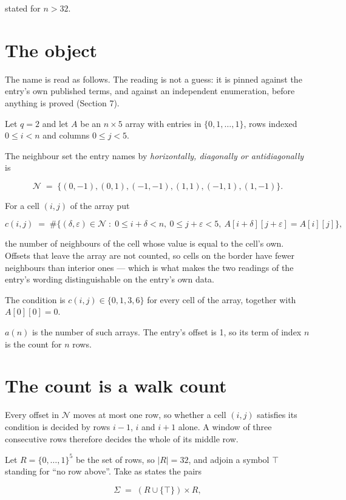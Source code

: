 \documentclass[11pt]{article}
\theoremstyle{definition}
\begin{document}
stated for $n > 32$.

\section{The object}

The name is read as follows. The reading is not a guess: it is pinned against the entry's own published terms, and against an independent enumeration, before anything is proved (Section 7).

Let $q = 2$ and let $A$ be an $n \times 5$ array with entries in $\{0,1,\dots,1\}$, rows indexed $0 \le i < n$ and columns $0 \le j < 5$.

The neighbour set the entry names by {\itshape horizontally, diagonally or antidiagonally} is

\[\mathcal{N} \;=\; \{(0,-1), (0,1), (-1,-1), (1,1), (-1,1), (1,-1)\}.\]

For a cell $(i,j)$ of the array put

\[c(i,j) \;=\; \#\bigl\{(\delta,\varepsilon)\in\mathcal{N} \;:\; 0\le i+\delta<n,\ 0\le j+\varepsilon<5,\ A[i+\delta][j+\varepsilon] = A[i][j]\bigr\},\]

the number of neighbours of the cell whose value is equal to the cell's own. Offsets that leave the array are not counted, so cells on the border have fewer neighbours than interior ones --- which is what makes the two readings of the entry's wording distinguishable on the entry's own data.

The condition is $c(i,j) \in \{0, 1, 3, 6\}$ for every cell of the array, together with $A[0][0]=0$.

$a(n)$ is the number of such arrays. The entry's offset is 1, so its term of index $n$ is the count for $n$ rows.

\section{The count is a walk count}

Every offset in $\mathcal{N}$ moves at most one row, so whether a cell $(i,j)$ satisfies its condition is decided by rows $i-1$, $i$ and $i+1$ alone. A window of three consecutive rows therefore decides the whole of its middle row.

Let $R = \{0,\dots,1\}^{5}$ be the set of rows, so $|R| = 32$, and adjoin a symbol $\top$ standing for ``no row above''. Take as states the pairs

\[\Sigma \;=\; (R \cup \{\top\}) \times R,\]
\end{document}
